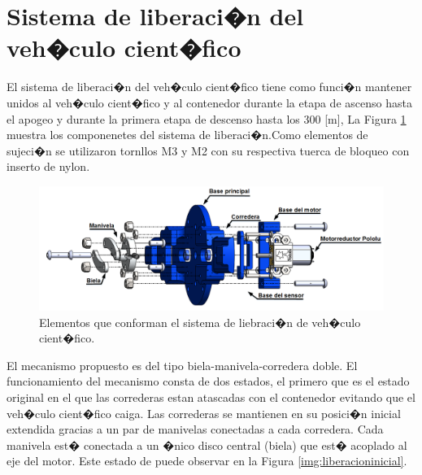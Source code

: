 \documentclass[10pt,a4paper]{book}
\begin{document}
\section*{Sistema de liberaci�n del veh�culo cient�fico}
El sistema de liberaci�n del veh�culo cient�fico tiene como funci�n mantener unidos al veh�culo cient�fico y al contenedor durante la etapa de ascenso hasta el apogeo y durante la primera etapa de descenso hasta los 300 [m], La Figura \ref{img:partesliberacion} muestra los componenetes del sistema de liberaci�n.Como elementos de sujeci�n se utilizaron tornllos M3 y M2 con su respectiva tuerca de bloqueo con inserto de nylon.
\begin{figure}[H]
\begin{center}
\includegraphics[scale=0.35]{Imagenes/Partesliberacion.png}  
\caption{Elementos que conforman el sistema de liebraci�n de veh�culo cient�fico.}
\label{img:partesliberacion}
\end{center}
\end{figure}
El mecanismo propuesto es del tipo biela-manivela-corredera doble. El funcionamiento del mecanismo consta de dos estados, el primero que es el estado original en el que las correderas estan atascadas con el contenedor evitando que el veh�culo cient�fico caiga. Las correderas se mantienen en su posici�n inicial extendida gracias a un par de manivelas conectadas a cada corredera. Cada manivela est� conectada a un �nico disco central (biela) que est� acoplado al eje del motor. Este estado de puede observar en la Figura \ref{img:liberacioninicial}.
\end{document}
